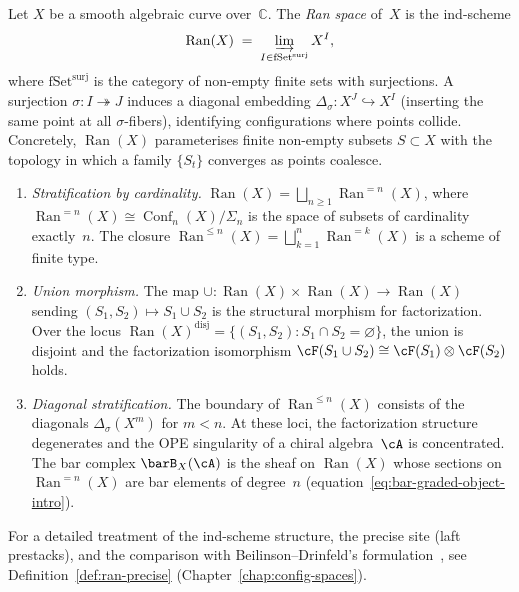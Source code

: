 \begin{definition}\label{def:ran-space}%
%
Let $X$ be a smooth algebraic curve over~$\mathbb{C}$.
The \emph{Ran space} of~$X$ is the ind-scheme
\[
\operatorname{Ran}(X)
\;=\;
\varinjlim_{I \in \mathrm{fSet}^{\mathrm{surj}}} X^I,
\]
where $\mathrm{fSet}^{\mathrm{surj}}$ is the category of
non-empty finite sets with surjections. A surjection
$\sigma\colon I \twoheadrightarrow J$ induces a diagonal
embedding $\Delta_\sigma\colon X^J \hookrightarrow X^I$
(inserting the same point at all $\sigma$-fibers),
identifying configurations where points collide.
Concretely, $\operatorname{Ran}(X)$ parameterises finite
non-empty subsets $S \subset X$ with the topology in which
a family $\{S_t\}$ converges as points coalesce.
\begin{enumerate}[label=\textup{(\roman*)}]
\item \emph{Stratification by cardinality.}\;
 $\operatorname{Ran}(X) = \bigsqcup_{n \geq 1}
 \operatorname{Ran}^{=n}(X)$,
 where $\operatorname{Ran}^{=n}(X) \cong
 \operatorname{Conf}_n(X) / \Sigma_n$
 is the space of subsets of cardinality exactly~$n$.
 The closure
 $\operatorname{Ran}^{\leq n}(X) = \bigsqcup_{k=1}^{n}
 \operatorname{Ran}^{=k}(X)$
 is a scheme of finite type.
\item \emph{Union morphism.}\;
 The map $\cup\colon
 \operatorname{Ran}(X) \times \operatorname{Ran}(X)
 \to \operatorname{Ran}(X)$ sending $(S_1, S_2) \mapsto
 S_1 \cup S_2$ is the structural morphism for
 factorization. Over the locus
 $\operatorname{Ran}(X)^{\mathrm{disj}}
 = \{(S_1, S_2) : S_1 \cap S_2 = \varnothing\}$,
 the union is disjoint and the factorization
 isomorphism $\cF(S_1 \cup S_2) \cong
 \cF(S_1) \otimes \cF(S_2)$ holds.
\item \emph{Diagonal stratification.}\;
 The boundary of $\operatorname{Ran}^{\leq n}(X)$
 consists of the diagonals $\Delta_\sigma(X^m)$ for
 $m < n$. At these loci, the factorization structure
 degenerates and the OPE singularity of a chiral
 algebra~$\cA$ is concentrated. The bar complex
 $\barB_X(\cA)$ is the sheaf on $\operatorname{Ran}(X)$
 whose sections on $\operatorname{Ran}^{=n}(X)$ are
 bar elements of degree~$n$
 (equation~\eqref{eq:bar-graded-object-intro}).
\end{enumerate}
For a detailed treatment of the ind-scheme structure,
the precise site (laft prestacks), and the comparison
with Beilinson--Drinfeld's formulation~\cite[\S3.4]{BD04},
see Definition~\ref{def:ran-precise}
(Chapter~\ref{chap:config-spaces}).
\end{definition}

